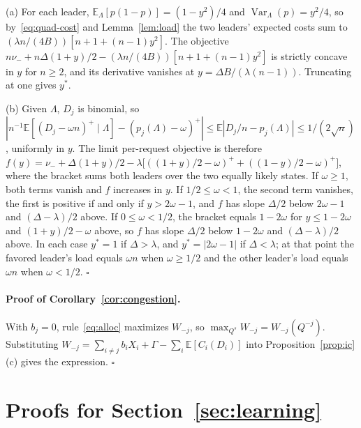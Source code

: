 \documentclass[opre,dblanonrev]{informs4}
\providecommand{\E}{\mathbb{E}}
\providecommand{\1}{\mathbf{1}}
\providecommand{\Var}{\operatorname{Var}}
\begin{document}
\begin{APPENDICES}
(a) For each leader, $\E_\Lambda[p(1-p)]=(1-y^2)/4$ and $\Var_\Lambda(p)=y^2/4$, so by~\eqref{eq:quad-cost} and Lemma~\ref{lem:load} the two leaders' expected costs sum to $(\lambda n/(4B))[n+1+(n-1)y^2]$. The objective $n\nu_-+n\Delta(1+y)/2-(\lambda n/(4B))[n+1+(n-1)y^2]$ is strictly concave in $y$ for $n\ge2$, and its derivative vanishes at $y=\Delta B/(\lambda(n-1))$. Truncating at one gives $y^\ast$.

(b) Given $\Lambda$, $D_j$ is binomial, so $|n^{-1}\E[(D_j-\omega n)^+\mid\Lambda]-(p_j(\Lambda)-\omega)^+|\le\E|D_j/n-p_j(\Lambda)|\le1/(2\sqrt n)$, uniformly in $y$. The limit per-request objective is therefore $f(y)=\nu_-+\Delta(1+y)/2-\lambda\bigl[((1+y)/2-\omega)^++((1-y)/2-\omega)^+\bigr]$, where the bracket sums both leaders over the two equally likely states. If $\omega\ge1$, both terms vanish and $f$ increases in $y$. If $1/2\le\omega<1$, the second term vanishes, the first is positive if and only if $y>2\omega-1$, and $f$ has slope $\Delta/2$ below $2\omega-1$ and $(\Delta-\lambda)/2$ above. If $0\le\omega<1/2$, the bracket equals $1-2\omega$ for $y\le1-2\omega$ and $(1+y)/2-\omega$ above, so $f$ has slope $\Delta/2$ below $1-2\omega$ and $(\Delta-\lambda)/2$ above. In each case $y^\ast=1$ if $\Delta>\lambda$, and $y^\ast=|2\omega-1|$ if $\Delta<\lambda$; at that point the favored leader's load equals $\omega n$ when $\omega\ge1/2$ and the other leader's load equals $\omega n$ when $\omega<1/2$. \hfill$\square$

\paragraph{Proof of Corollary~\ref{cor:congestion}.}
With $b_j=0$, rule~\eqref{eq:alloc} maximizes $W_{-j}$, so $\max_{Q^s}W_{-j}=W_{-j}(Q^{-j})$. Substituting $W_{-j}=\sum_{i\ne j}b_iX_i+\Gamma-\sum_i\E[C_i(D_i)]$ into Proposition~\ref{prop:ic}(c) gives the expression. \hfill$\square$

\section{Proofs for Section~\ref{sec:learning}}\label{app:learning}


\end{APPENDICES}
\end{document}

